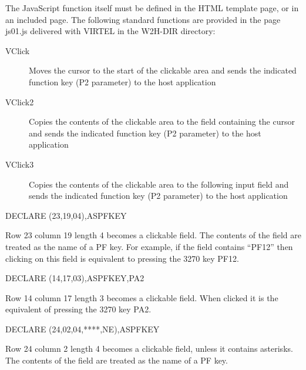 \documentclass[letterpaper,10pt,english]{sphinxmanual}
\begin{document}
The JavaScript function itself must be defined in the HTML template page, or in an included page. The following standard functions are provided in the page js01.js delivered with VIRTEL in the W2H-DIR directory:
\begin{description}
\item[{VClick}] \leavevmode
Moves the cursor to the start of the clickable area and sends the indicated function key (P2 parameter) to the host application

\item[{VClick2}] \leavevmode
Copies the contents of the clickable area to the field containing the cursor and sends the indicated function key (P2 parameter) to the host application

\item[{VClick3}] \leavevmode
Copies the contents of the clickable area to the following input field and sends the indicated function key (P2 parameter) to the host application

\end{description}


\begin{sphinxVerbatim}[commandchars=\\\{\}]
DECLARE\PYGZdl{} (23,19,04),AS\PYGZhy{}PFKEY
\end{sphinxVerbatim}

Row 23 column 19 length 4 becomes a clickable field. The contents of the field are treated as the name of a PF key. For example, if the field contains “PF12” then clicking on this field is equivalent to pressing the 3270 key PF12.

\begin{sphinxVerbatim}[commandchars=\\\{\}]
DECLARE\PYGZdl{} (14,17,03),AS\PYGZhy{}PFKEY,\PYGZsq{}PA2\PYGZsq{}
\end{sphinxVerbatim}

Row 14 column 17 length 3 becomes a clickable field. When clicked it is the equivalent of pressing the 3270 key PA2.

\begin{sphinxVerbatim}[commandchars=\\\{\}]
DECLARE\PYGZdl{} (24,02,04,\PYGZsq{}****\PYGZsq{},NE),AS\PYGZhy{}PFKEY
\end{sphinxVerbatim}

Row 24 column 2 length 4 becomes a clickable field, unless it contains asterisks. The contents of the field are treated as the name of a PF key.
\end{document}
